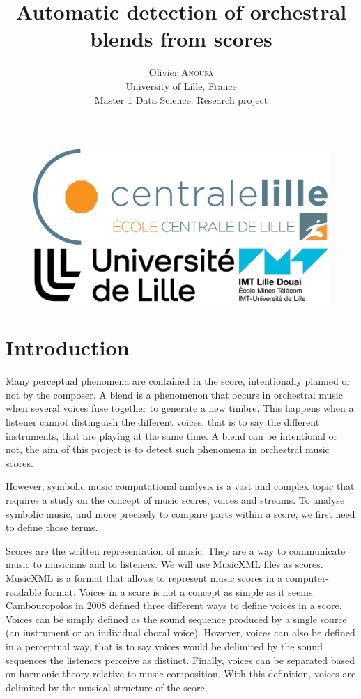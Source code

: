 \documentclass[11pt, a4paper]{article}
\begin{document}
\begin{figure}[t]%
    \centering
    \includegraphics[width=.5\linewidth]{logos_empile}
\end{figure}

\title{Automatic detection of orchestral blends from scores}

\author{Olivier \textsc{Anoufa} \\  University of Lille, France \\ Master 1 Data Science: Research project}

{\let\newpage\relax\maketitle}

\newpage

\section*{Introduction}

Many perceptual phenomena are contained in the score, intentionally planned or not by the composer.
A blend is a phenomenon that occurs in orchestral music when several voices fuse together to generate a new timbre\cite{mcadams_taxonomy_2022}.
This happens when a listener cannot distinguish the different voices, that is to say the different instruments, that are playing at the same time.
A blend can be intentional or not, the aim of this project is to detect such phenomena in orchestral music scores.


However, symbolic music computational analysis is a vast and complex topic that requires a study on the concept of music scores, voices and streams.
To analyse symbolic music, and more precisely to compare parts within a score, we first need to define those terms.

Scores are the written representation of music. They are a way to communicate music to musicians and to listeners.
We will use MusicXML files as scores. MusicXML is a format that allows to represent music scores in a computer-readable format.
Voices in a score is not a concept as simple as it seems. Cambouropolos in 2008 defined three different ways to define voices in a score.
Voices can be simply defined as the sound sequence produced by a single source (an instrument or an individual choral voice).
However, voices can also be defined in a perceptual way, that is to say voices would be delimited by the sound sequences the listeners perceive as distinct.
Finally, voices can be separated based on harmonic theory relative to music composition.
With this definition, voices are delimited by the musical structure of the score\cite{10.1525/mp.2008.26.1.75}.
\end{document}
